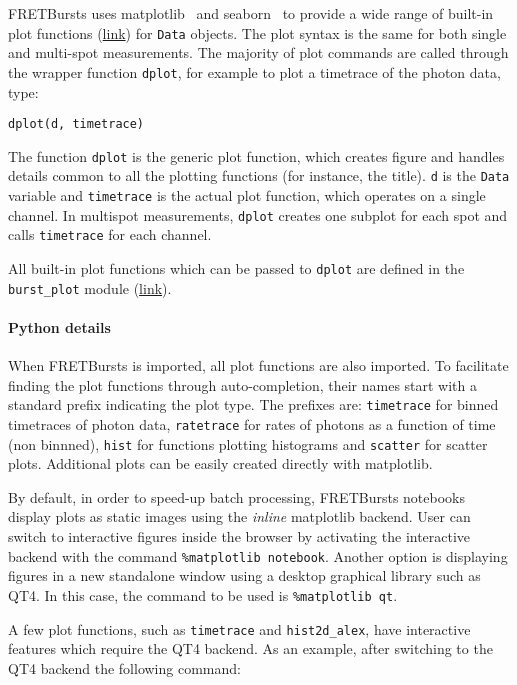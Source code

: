 FRETBursts uses
matplotlib~\cite{matplotlib}
and seaborn~\cite{seaborn}
to provide a wide range of built-in plot functions
(\href{http://fretbursts.readthedocs.org/en/latest/plots.html}{link})
for \verb|Data| objects.
The plot syntax is the same for both single and multi-spot measurements.
The majority of plot commands are called through the wrapper function
\verb|dplot|, for example to plot a timetrace of the photon data, type:

\begin{lstlisting}
dplot(d, timetrace)
\end{lstlisting}

The function \verb|dplot| is the generic plot function, which creates figure
and handles details common to all the plotting functions (for instance, the title).
\verb|d| is the \verb|Data| variable and \verb|timetrace| is the actual plot
function, which operates on a single channel. In multispot measurements,
\verb|dplot| creates one subplot for each spot and calls \verb|timetrace| for
each channel.

All built-in plot functions which can be passed to
\verb|dplot| are defined in the
\verb|burst_plot| module
(\href{http://fretbursts.readthedocs.org/en/latest/plots.html}{link}).

\paragraph{Python details}
When FRETBursts is imported, all plot functions are also imported.
To facilitate finding the plot functions through auto-completion,
their names start with a standard prefix indicating the
plot type. The prefixes are: \verb|timetrace| for binned timetraces
of photon data, \verb|ratetrace| for rates of photons as a function of time (non
binnned), \verb|hist| for functions plotting histograms and \verb|scatter| for
scatter plots.
Additional plots can be easily created directly with matplotlib.

By default, in order to speed-up batch processing, FRETBursts notebooks display plots
as static images using the \textit{inline} matplotlib backend.
User can switch to interactive figures inside the browser by activating
the interactive backend with the command \verb|%matplotlib notebook|.
Another option is displaying figures in a new standalone window
using a desktop graphical library such as QT4.
In this case, the command to be used is \verb|%matplotlib qt|.

A few plot functions, such as \verb|timetrace| and \verb|hist2d_alex|, have interactive features
which require the QT4 backend. As an example, after switching to the QT4 backend
the following command:

